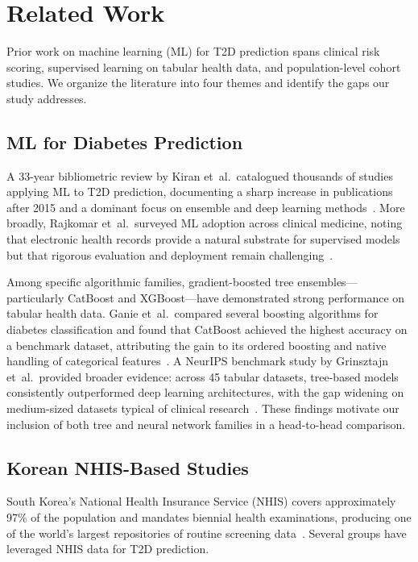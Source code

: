 \section{Related Work}
\label{sec:related-work}

Prior work on machine learning (ML) for T2D prediction spans clinical risk scoring, supervised learning on tabular health data, and population-level cohort studies.  We organize the literature into four themes and identify the gaps our study addresses.

\subsection{ML for Diabetes Prediction}
\label{sec:rw-ml-diabetes}

A 33-year bibliometric review by Kiran et~al.\ catalogued thousands of studies applying ML to T2D prediction, documenting a sharp increase in publications after 2015 and a dominant focus on ensemble and deep learning methods~\cite{Kiran2025bibliometric}.  More broadly, Rajkomar et~al.\ surveyed ML adoption across clinical medicine, noting that electronic health records provide a natural substrate for supervised models but that rigorous evaluation and deployment remain challenging~\cite{Rajkomar2019ml}.

Among specific algorithmic families, gradient-boosted tree ensembles---particularly CatBoost and XGBoost---have demonstrated strong performance on tabular health data.  Ganie et~al.\ compared several boosting algorithms for diabetes classification and found that CatBoost achieved the highest accuracy on a benchmark dataset, attributing the gain to its ordered boosting and native handling of categorical features~\cite{Ganie2023ensemble}.  A NeurIPS benchmark study by Grinsztajn et~al.\ provided broader evidence: across 45 tabular datasets, tree-based models consistently outperformed deep learning architectures, with the gap widening on medium-sized datasets typical of clinical research~\cite{Grinsztajn2022trees}.  These findings motivate our inclusion of both tree and neural network families in a head-to-head comparison.

\subsection{Korean NHIS-Based Studies}
\label{sec:rw-nhis}

South Korea's National Health Insurance Service (NHIS) covers approximately 97\% of the population and mandates biennial health examinations, producing one of the world's largest repositories of routine screening data~\cite{Lim2025nhis}.  Several groups have leveraged NHIS data for T2D prediction.

